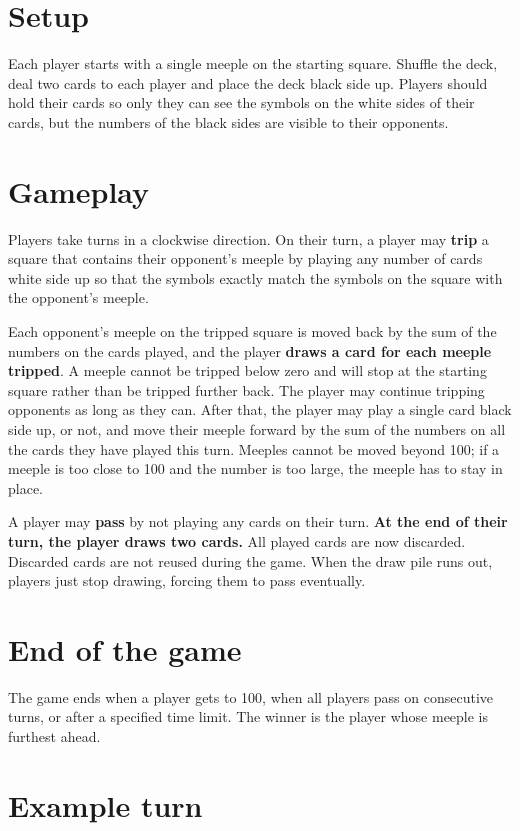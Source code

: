 \documentclass{article}
\begin{document}
\section*{Setup}

Each player starts with a single meeple on the starting square. Shuffle the deck, deal two cards to each player and place the deck black side up. Players should hold their cards so only they can see the symbols on the white sides of their cards, but the numbers of the black sides are visible to their opponents.

\section*{Gameplay}

Players take turns in a clockwise direction. On their turn, a player may \textbf{trip} a square that contains their opponent’s meeple by playing any number of cards white side up so that the symbols exactly match the symbols on the square with the opponent’s meeple.

Each opponent’s meeple on the tripped square is moved back by the sum of the numbers on the cards played, and the player \textbf{draws a card for each meeple tripped}. A meeple cannot be tripped below zero and will stop at the starting square rather than be tripped further back. The player may continue tripping opponents as long as they can. After that, the player may play a single card black side up, or not, and move their meeple forward by the sum of the numbers on all the cards they have played this turn. Meeples cannot be moved beyond 100; if a meeple is too close to 100 and the number is too large, the meeple has to stay in place. 

A player may \textbf{pass} by not playing any cards on their turn. \textbf{At the end of their turn, the player draws two cards.} All played cards are now discarded. Discarded cards are not reused during the game. When the draw pile runs out, players just stop drawing, forcing them to pass eventually. 
 
\section*{End of the game}

The game ends when a player gets to 100, when all players pass on consecutive turns, or after a specified time limit. The winner is the player whose meeple is furthest ahead.

\section*{Example turn}
\end{document}
